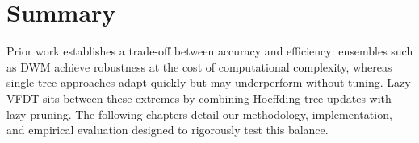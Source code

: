 \section{Summary}
Prior work establishes a trade-off between accuracy and efficiency: ensembles such as DWM achieve robustness at the cost of computational complexity, whereas single-tree approaches adapt quickly but may underperform without tuning.  Lazy VFDT sits between these extremes by combining Hoeffding-tree updates with lazy pruning.  The following chapters detail our methodology, implementation, and empirical evaluation designed to rigorously test this balance.
